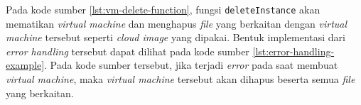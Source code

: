 Pada kode sumber \ref{lst:vm-delete-function}, fungsi \lstinline{deleteInstance}
akan mematikan \emph{virtual machine} dan menghapus \emph{file} yang berkaitan
dengan \emph{virtual machine} tersebut seperti \emph{cloud image} yang dipakai.
Bentuk implementasi dari \emph{error handling} tersebut dapat dilihat pada kode
sumber \ref{lst:error-handling-example}. Pada kode sumber tersebut, jika terjadi
\emph{error} pada saat membuat \emph{virtual machine}, maka \emph{virtual machine}
tersebut akan dihapus beserta semua \emph{file} yang berkaitan.

